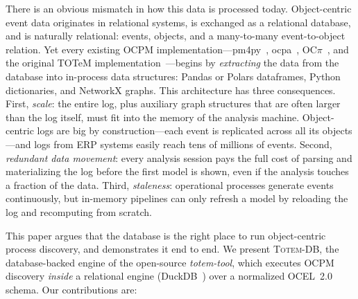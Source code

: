 \documentclass[sigconf, nonacm]{acmart}
\newcommand{\sys}{\textsc{Totem-DB}\xspace}
\newcommand{\ocel}{OCEL~2.0\xspace}
\begin{document}
There is an obvious mismatch in how this data is processed today. Object-centric event data originates in relational systems, is exchanged as a relational database, and is naturally relational: events, objects, and a many-to-many event-to-object relation. Yet every existing OCPM implementation---pm4py~\cite{pm4py}, ocpa~\cite{ocpa}, OC$\pi$~\cite{adams2021ocpi}, and the original TOTeM implementation~\cite{liss2024totem}---begins by \emph{extracting} the data from the database into in-process data structures: Pandas or Polars dataframes, Python dictionaries, and NetworkX graphs. This architecture has three consequences.
First, \emph{scale}: the entire log, plus auxiliary graph structures that are often larger than the log itself, must fit into the memory of the analysis machine. Object-centric logs are big by construction---each event is replicated across all its objects---and logs from ERP systems easily reach tens of millions of events.
Second, \emph{redundant data movement}: every analysis session pays the full cost of parsing and materializing the log before the first model is shown, even if the analysis touches a fraction of the data.
Third, \emph{staleness}: operational processes generate events continuously, but in-memory pipelines can only refresh a model by reloading the log and recomputing from scratch.

\smallskip
\noindent
This paper argues that the database is the right place to run object-centric process discovery, and demonstrates it end to end. We present \sys, the database-backed engine of the open-source \emph{totem-tool}, which executes OCPM discovery \emph{inside} a relational engine (DuckDB~\cite{duckdb}) over a normalized \ocel schema. Our contributions are:
\end{document}
